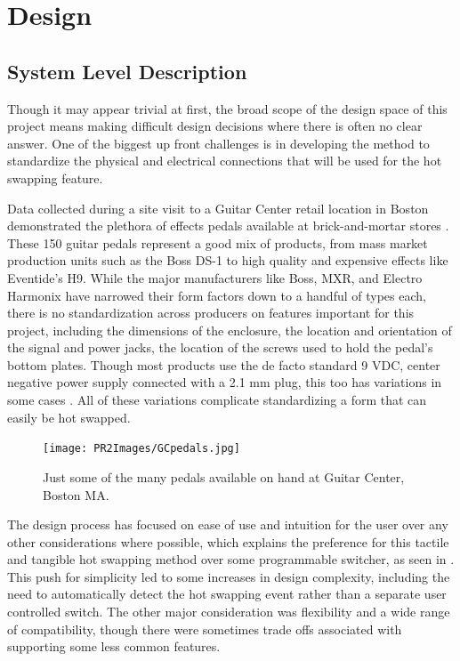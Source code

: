 \documentclass{article}
\begin{document}
\section{Design}
	\subsection{System Level Description}

	Though it may appear trivial at first, the broad scope of the design space of this project means making difficult design decisions where there is often no clear answer.  One of the biggest up front challenges is in developing the method to standardize the physical and electrical connections that will be used for the hot swapping feature.  

	Data collected during a site visit to a Guitar Center retail location in Boston demonstrated the plethora of effects pedals available at brick-and-mortar stores \cite{MyPedalData}.  These 150 guitar pedals represent a good mix of products, from mass market production units such as the Boss DS-1 to high quality and expensive effects like Eventide's H9.  While the major manufacturers like Boss, MXR, and Electro Harmonix have narrowed their form factors down to a handful of types each, there is no standardization across producers on features important for this project, including the dimensions of the enclosure, the location and orientation of the signal and power jacks, the location of the screws used to hold the pedal's bottom plates.  Though most products use the de facto standard 9 VDC, center negative power supply connected with a 2.1 mm plug, this too has variations in some cases \cite{MyPedalData}.  All of these variations complicate standardizing a form that can easily be hot swapped.

	\begin{figure}
		\centering
		\texttt{[image: PR2Images/GCpedals.jpg]}
		\caption{Just some of the many pedals available on hand at Guitar Center, Boston MA.}
		\label{fig:GCpedalscase}
	\end{figure}

	The design process has focused on ease of use and intuition for the user over any other considerations where possible, which explains the preference for this tactile and tangible hot swapping method over some programmable switcher, as seen in \cite{ProgrammableSwitcherExample}.  This push for simplicity led to some increases in design complexity, including the need to automatically detect the hot swapping event rather than a separate user controlled switch.  The other major consideration was flexibility and a wide range of compatibility, though there were sometimes trade offs associated with supporting some less common features.
\end{document}
